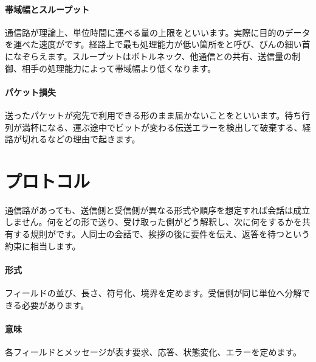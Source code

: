 \par
\endgroup
\medskip
\begingroup
\paragraph{帯域幅とスループット}
        通信路が理論上、単位時間に運べる量の上限をといいます。実際に目的のデータを運べた速度がです。経路上で最も処理能力が低い箇所をと呼び、びんの細い首になぞらえます。スループットはボトルネック、他通信との共有、送信量の制御、相手の処理能力によって帯域幅より低くなります。

\paragraph{パケット損失}
        送ったパケットが宛先で利用できる形のまま届かないことをといいます。待ち行列が満杯になる、運ぶ途中でビットが変わる伝送エラーを検出して破棄する、経路が切れるなどの理由で起きます。

\par
\endgroup
\par
\endgroup


\section{プロトコル}
\label{sec:05-network-03}

通信路があっても、送信側と受信側が異なる形式や順序を想定すれば会話は成立しません。何をどの形で送り、受け取った側がどう解釈し、次に何をするかを共有する規則がです。人同士の会話で、挨拶の後に要件を伝え、返答を待つという約束に相当します。

\begingroup
\begingroup
\paragraph{形式}
        フィールドの並び、長さ、符号化、境界を定めます。受信側が同じ単位へ分解できる必要があります。

\par
\endgroup
\medskip
\begingroup
\paragraph{意味}
        各フィールドとメッセージが表す要求、応答、状態変化、エラーを定めます。

\par
\endgroup
\medskip
\begingroup
